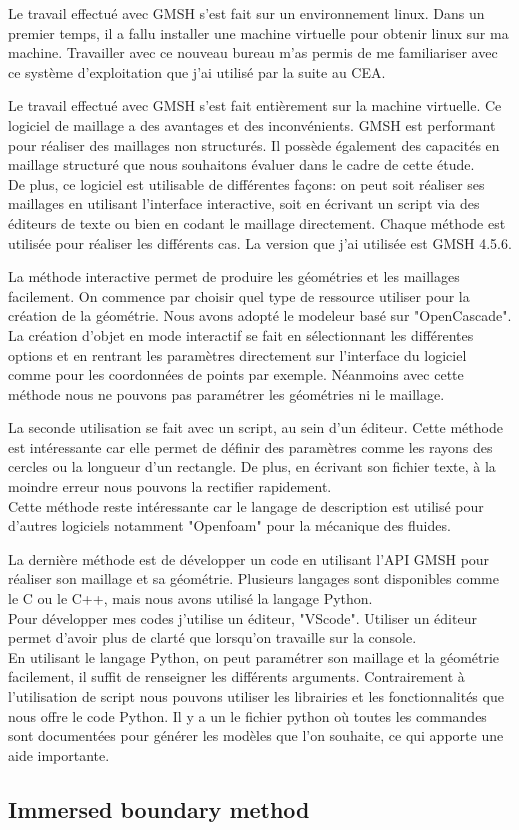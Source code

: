 Le travail effectué avec GMSH s'est fait sur un environnement linux. Dans un premier temps, il a fallu installer une machine virtuelle pour obtenir linux sur ma machine. Travailler avec ce nouveau bureau m'as permis de me familiariser avec ce système d'exploitation que j'ai utilisé par la suite au CEA.

Le travail effectué avec GMSH s'est fait entièrement sur la machine virtuelle. Ce logiciel de maillage a des avantages et des inconvénients. GMSH est performant pour réaliser des maillages non structurés. Il possède également des capacités en maillage structuré que nous souhaitons évaluer dans le cadre de cette étude.\\
De plus, ce logiciel est utilisable de différentes façons: on peut soit réaliser ses maillages en utilisant l'interface interactive, soit en écrivant un script via des éditeurs de texte ou bien en codant le maillage directement. Chaque méthode est utilisée pour réaliser les différents cas. La version que j'ai utilisée est GMSH 4.5.6.

La méthode interactive permet de produire les géométries et les maillages facilement. On commence par choisir quel type de ressource utiliser pour la création de la géométrie. Nous avons adopté le modeleur basé sur "OpenCascade".\\
La création d'objet en mode interactif se fait en sélectionnant les différentes options et en rentrant les paramètres directement sur l'interface du logiciel comme pour les coordonnées de points par exemple. Néanmoins avec cette méthode nous ne pouvons pas paramétrer les géométries ni le maillage.

La seconde utilisation se fait avec un script, au sein d'un éditeur. Cette méthode est intéressante car elle permet de définir des paramètres comme les rayons des cercles ou la longueur d'un rectangle. De plus, en écrivant son fichier texte, à la moindre erreur nous pouvons la rectifier rapidement.\\
Cette méthode reste intéressante car le langage de description est utilisé pour d'autres logiciels notamment "Openfoam" pour la mécanique des fluides.

La dernière méthode est de développer un code en utilisant l'API GMSH pour réaliser son maillage et sa géométrie. Plusieurs langages sont disponibles comme le C ou le C++, mais nous avons utilisé la langage Python.\\
Pour développer mes codes j'utilise un éditeur, "VScode". Utiliser un éditeur permet d'avoir plus de clarté que lorsqu'on travaille sur la console.\\
En utilisant le langage Python, on peut paramétrer son maillage et la géométrie facilement, il suffit de renseigner les différents arguments. Contrairement à l'utilisation de script nous pouvons utiliser les librairies et les fonctionnalités que nous offre le code Python. Il y a un le fichier python où toutes les commandes sont documentées pour générer les modèles que l'on souhaite, ce qui apporte une aide importante.

\subsection{Immersed boundary method}
